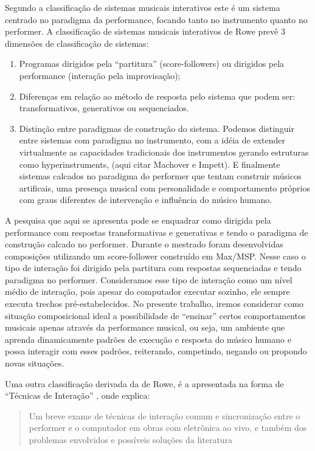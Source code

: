 \documentclass{ppgmus}
\begin{document}
Segundo a classificação de sistemas musicais interativos \cite{rowe93:interactive}
este é um sistema centrado no paradigma da performance, focando tanto
no instrumento quanto no performer. A classificação de sistemas
musicais interativos de Rowe prevê 3 dimensões de classificação de
sistemas:

\begin{enumerate}
\item Programas dirigidos pela ``partitura'' (score-followers) ou
  dirigidos pela performance (interação pela improvisação);
\item Diferenças em relação ao método de resposta pelo sistema que
  podem ser: transformativos, generativos ou sequenciados.
\item Distinção entre paradigmas de construção do sistema. Podemos
  distinguir entre sistemas com paradigma no instrumento, com a idéia
  de extender virtualmente as capacidades tradicionais dos
  instrumentos gerando estruturas como hyperinstruments, (aqui citar
  Machover e Impett). E finalmente sistemas calcados no paradigma do
  performer que tentam construir músicos artificais, uma presença
  musical com personalidade e comportamento próprios com graus
  diferentes de intervenção e influência do músico humano.
\end{enumerate}

A pesquisa que aqui se apresenta pode se enquadrar como dirigida pela
performance com respostas transformativas e generativas e tendo o
paradigma de construção calcado no performer. Durante o mestrado foram
desenvolvidas composições utilizando um score-follower construído em
Max/MSP. Nesse caso o tipo de interação foi dirigido pela partitura
com respostas sequenciadas e tendo paradigma no performer.
Consideramos esse tipo de interação como um nível médio de interação,
pois apesar do computador executar sozinho, ele sempre executa trechos
pré-estabelecidos. No presente trabalho, iremos considerar como
situação composicional ideal a possibilidade de “ensinar” certos
comportamentos musicais apenas através da performance musical, ou
seja, um ambiente que aprenda dinamicamente padrões de execução e
resposta do músico humano e possa interagir com esses padrões,
reiterando, competindo, negando ou propondo novas situações.

Uma outra classificação derivada da de Rowe, é a apresentada na forma
de ``Técnicas de Interação'' \cite{pestova:tese}, onde  explica:
\begin{quote}
 Um breve exame de técnicas de interação comum e sincronização entre o
performer e o computador em obras com eletrônica ao vivo, e também dos problemas
envolvidos e possíveis soluções da literatura
\end{quote} 
\end{document}

